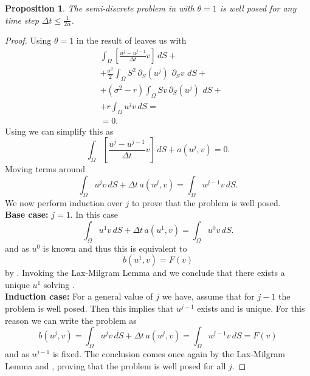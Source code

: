 \documentclass{article}
\newtheorem{prop}[thm]{Proposition}
\newcommand{\argwrapsquare}[1]{\left[#1\right]}
\newcommand{\intS}[1]{\ensuremath{\int_{\Omega}#1 \, dS}}
\newcommand{\intSlong}[1]{\intS{\argwrapsquare{#1}}}
\newcommand{\darg}[2]{\ensuremath{\, \partial_{#2}#1} \, }
\newcommand{\dS}[1]{\ensuremath{\darg{#1}{S}}}
\newcommand{\dSv}{\dS{v}}
\newcommand{\sigmafrac}{\ensuremath{\frac{\sigma^2}{2}}}
\begin{document}
\begin{prop}\label{prop:lax_milgram}
    The semi-discrete problem in  with $\theta = 1$ is well posed for any time step $\Delta t \leq \frac{1}{2 \alpha}$.
\end{prop}
\begin{proof}
    Using $\theta = 1$ in the result of  leaves us with
    \begin{align*}
        &\intSlong{\frac{u^{j} - u^{j-1}}{\Delta t}  v} + \\
        &+\sigmafrac \intS{S^2 \dS{\left(u^{j}\right)} \dSv} + \\
        &+ (\sigma^2 - r) \intS{S v \dS{\left(u^{j}\right)}} + \\
        &+r \intS{u^{j}v} =\\
        &=0.
        \end{align*}
    Using  we can simplify this as
    \begin{equation*}
    \intSlong{\frac{u^{j} - u^{j-1}}{\Delta t} v} + a(u^{j},v) = 0.
    \end{equation*}
    Moving terms around
    \begin{equation*}
        \intS{u^{j}v} + \Delta t \,a(u^{j},v) = \intS{u^{j-1}v}.
    \end{equation*}
    We now perform induction over $j$ to prove that the problem is well posed.\\
    \textbf{Base case:} $j = 1$. In this case
    \begin{equation*}
        \intS{u^{1}v} + \Delta t \,a(u^{1},v) = \intS{u^{0}v}.
    \end{equation*}
    and as $u^0$ is known and thus this is equivalent to 
    \begin{equation}\label{eq:base_case}
        b(u^{1}, v) = F(v)
    \end{equation}
    by . Invoking the Lax-Milgram Lemma  and  we conclude that there exists a unique $u^1$ solving .\\
    \textbf{Induction case: } For a general value of $j$ we have, assume that for $j-1$ the problem is well posed. Then this implies that $u^{j-1}$ exists and is unique. For this reason we can write the problem as
    \begin{equation*}
        b(u^{j},v)=\intS{u^{j}v} + \Delta t \,a(u^{j},v) = \intS{u^{j-1}v} = F(v)
    \end{equation*}
    and as $u^{j-1}$ is fixed. The conclusion comes once again by the Lax-Milgram Lemma  and , proving that the problem is well posed for all $j$. \qedhere
    
    
\end{proof}
\end{document}

